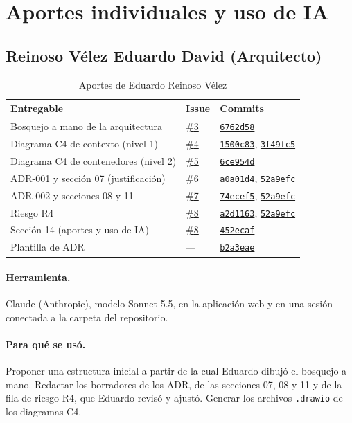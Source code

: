 \section{Aportes individuales y uso de IA}

\subsection{Reinoso Vélez Eduardo David (Arquitecto)}

\providecommand{\gh}[2]{\href{https://github.com/Johnst2000/ta-pfc-e1-ssdc-distribuido/#1}{#2}}
\providecommand{\ghc}[1]{\gh{commit/#1}{\texttt{#1}}}
\providecommand{\ghi}[1]{\gh{issues/#1}{\#{#1}}}

\begin{table}[H]
\centering
\small
\caption{Aportes de Eduardo Reinoso Vélez}
\begin{tabularx}{\linewidth}{@{}p{6.2cm}p{1.1cm}X@{}}
\toprule
\textbf{Entregable} & \textbf{Issue} & \textbf{Commits} \\
\midrule
Bosquejo a mano de la arquitectura & \ghi{3} & \ghc{6762d58} \\
Diagrama C4 de contexto (nivel 1) & \ghi{4} & \ghc{1500c83}, \ghc{3f49fc5} \\
Diagrama C4 de contenedores (nivel 2) & \ghi{5} & \ghc{6ce954d} \\
ADR-001 y sección 07 (justificación) & \ghi{6} & \ghc{a0a01d4}, \ghc{52a9efc} \\
ADR-002 y secciones 08 y 11 & \ghi{7} & \ghc{74ecef5}, \ghc{52a9efc} \\
Riesgo R4 & \ghi{8} & \ghc{a2d1163}, \ghc{52a9efc} \\
Sección 14 (aportes y uso de IA) & \ghi{8} & \ghc{452ecaf} \\
Plantilla de ADR & --- & \ghc{b2a3eae} \\
\bottomrule
\end{tabularx}
\end{table}

\paragraph{Herramienta.} Claude (Anthropic), modelo Sonnet 5.5, en la aplicación web y en una sesión conectada a la carpeta del repositorio.

\paragraph{Para qué se usó.} Proponer una estructura inicial a partir de la cual Eduardo dibujó el bosquejo a mano. Redactar los borradores de los ADR, de las secciones 07, 08 y 11 y de la fila de riesgo R4, que Eduardo revisó y ajustó. Generar los archivos \texttt{.drawio} de los diagramas C4.

